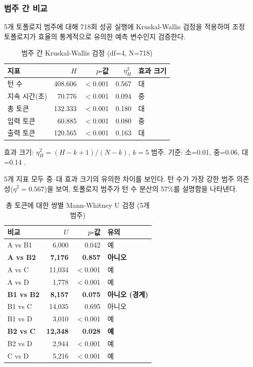 \documentclass[a4paper,11pt]{article}
\begin{document}
\subsubsection{범주 간 비교}

5개 토폴로지 범주에 대해 718회 성공 실행에 Kruskal-Wallis 검정을 적용하여 조정 토폴로지가 효율의 통계적으로 유의한 예측 변수인지 검증한다.

\begin{table}[H]
\centering
\caption{범주 간 Kruskal-Wallis 검정 (df=4, N=718)}
\label{tab:kw-cross-cat}
{\small
\begin{tabular}{lrrrl}
\toprule
지표 & $H$ & $p$-값 & $\eta^{2}_{H}$ & 효과 크기 \\
\midrule
턴 수        & 408.606 & $<$0.001 & 0.567 & 대 \\
지속 시간(초) & 70.776  & $<$0.001 & 0.094 & 중 \\
총 토큰      & 132.333 & $<$0.001 & 0.180 & 대 \\
입력 토큰    & 60.885  & $<$0.001 & 0.080 & 중 \\
출력 토큰    & 120.565 & $<$0.001 & 0.163 & 대 \\
\bottomrule
\end{tabular}
}

\smallskip
{\footnotesize 효과 크기: $\eta^{2}_{H} = (H - k + 1) / (N - k)$, $k=5$ 범주. 기준: 소=0.01, 중=0.06, 대=0.14 \citep{cohen1988}.}
\end{table}

5개 지표 모두 중--대 효과 크기의 유의한 차이를 보인다. 턴 수가 가장 강한 범주 의존성($\eta^{2}=0.567$)을 보여, 토폴로지 범주가 턴 수 분산의 57\%를 설명함을 나타낸다.

\begin{table}[H]
\centering
\caption{총 토큰에 대한 쌍별 Mann-Whitney U 검정 (5개 범주)}
\label{tab:pairwise-mwu}
{\small
\begin{tabular}{lrrl}
\toprule
비교 & $U$ & $p$-값 & 유의 \\
\midrule
A vs B1           & 6,000  & 0.042   & 예 \\
\textbf{A vs B2}  & \textbf{7,176}  & \textbf{0.857} & \textbf{아니오} \\
A vs C            & 11,034 & $<$0.001 & 예 \\
A vs D            & 1,778  & $<$0.001 & 예 \\
\textbf{B1 vs B2} & \textbf{8,157}  & \textbf{0.075} & \textbf{아니오 (경계)} \\
B1 vs C           & 14,035 & 0.695   & 아니오 \\
B1 vs D           & 3,010  & $<$0.001 & 예 \\
\textbf{B2 vs C}  & \textbf{12,348} & \textbf{0.028} & \textbf{예} \\
B2 vs D           & 2,944  & $<$0.001 & 예 \\
C vs D            & 5,216  & $<$0.001 & 예 \\
\bottomrule
\end{tabular}
}
\end{table}
\end{document}
